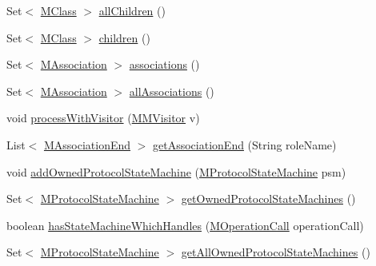 \begin{DoxyCompactItemize}
\item 
Set$<$ \hyperlink{interfaceorg_1_1tzi_1_1use_1_1uml_1_1mm_1_1_m_class}{M\-Class} $>$ \hyperlink{classorg_1_1tzi_1_1use_1_1uml_1_1mm_1_1_m_class_impl_a27f77d921f23442bccb72d76c2cf6bf4}{all\-Children} ()
\item 
Set$<$ \hyperlink{interfaceorg_1_1tzi_1_1use_1_1uml_1_1mm_1_1_m_class}{M\-Class} $>$ \hyperlink{classorg_1_1tzi_1_1use_1_1uml_1_1mm_1_1_m_class_impl_a487c9efd0ad2665c1a1e0b6ccb954e13}{children} ()
\item 
Set$<$ \hyperlink{interfaceorg_1_1tzi_1_1use_1_1uml_1_1mm_1_1_m_association}{M\-Association} $>$ \hyperlink{classorg_1_1tzi_1_1use_1_1uml_1_1mm_1_1_m_class_impl_a7c63dcfdef8d6d56c6eb34735dc3097d}{associations} ()
\item 
Set$<$ \hyperlink{interfaceorg_1_1tzi_1_1use_1_1uml_1_1mm_1_1_m_association}{M\-Association} $>$ \hyperlink{classorg_1_1tzi_1_1use_1_1uml_1_1mm_1_1_m_class_impl_a1c0c1bacf96c1e3514680aed1fbb8e56}{all\-Associations} ()
\item 
void \hyperlink{classorg_1_1tzi_1_1use_1_1uml_1_1mm_1_1_m_class_impl_a7adbf75100ecad18657633069fa70c3a}{process\-With\-Visitor} (\hyperlink{interfaceorg_1_1tzi_1_1use_1_1uml_1_1mm_1_1_m_m_visitor}{M\-M\-Visitor} v)
\item 
List$<$ \hyperlink{classorg_1_1tzi_1_1use_1_1uml_1_1mm_1_1_m_association_end}{M\-Association\-End} $>$ \hyperlink{classorg_1_1tzi_1_1use_1_1uml_1_1mm_1_1_m_class_impl_ab5c57e951197d243a4253cb9eb5e6efe}{get\-Association\-End} (String role\-Name)
\item 
void \hyperlink{classorg_1_1tzi_1_1use_1_1uml_1_1mm_1_1_m_class_impl_af23643c9fd933e6ac54a22e489acaa14}{add\-Owned\-Protocol\-State\-Machine} (\hyperlink{classorg_1_1tzi_1_1use_1_1uml_1_1mm_1_1statemachines_1_1_m_protocol_state_machine}{M\-Protocol\-State\-Machine} psm)
\item 
Set$<$ \hyperlink{classorg_1_1tzi_1_1use_1_1uml_1_1mm_1_1statemachines_1_1_m_protocol_state_machine}{M\-Protocol\-State\-Machine} $>$ \hyperlink{classorg_1_1tzi_1_1use_1_1uml_1_1mm_1_1_m_class_impl_ac2c4764a9e5aed61c088f74bb0d2dc27}{get\-Owned\-Protocol\-State\-Machines} ()
\item 
boolean \hyperlink{classorg_1_1tzi_1_1use_1_1uml_1_1mm_1_1_m_class_impl_ac7e1618c453ee0ad61b4e188716d9abd}{has\-State\-Machine\-Which\-Handles} (\hyperlink{classorg_1_1tzi_1_1use_1_1uml_1_1sys_1_1_m_operation_call}{M\-Operation\-Call} operation\-Call)
\item 
Set$<$ \hyperlink{classorg_1_1tzi_1_1use_1_1uml_1_1mm_1_1statemachines_1_1_m_protocol_state_machine}{M\-Protocol\-State\-Machine} $>$ \hyperlink{classorg_1_1tzi_1_1use_1_1uml_1_1mm_1_1_m_class_impl_a25593ab9812d484cb02b8f4170787070}{get\-All\-Owned\-Protocol\-State\-Machines} ()
\end{DoxyCompactItemize}
